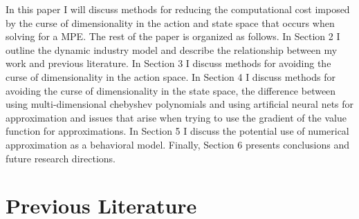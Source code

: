 \documentclass[12pt]{article}
\begin{document}


In this paper I will discuss methods for reducing the computational cost imposed by the curse of dimensionality in the action and state space that occurs when solving for a MPE. The rest of the paper is organized as follows. In Section 2 I outline the dynamic industry model and describe the relationship between my work and previous literature. In Section 3 I discuss methods for avoiding the curse of dimensionality in the action space. In Section 4 I discuss methods for avoiding the curse of dimensionality in the state space, the difference between using multi-dimensional chebyshev polynomials and using artificial neural nets for approximation and issues that arise when trying to use the gradient of the value function for approximations. In Section 5 I discuss the potential use of numerical approximation as a behavioral model. Finally, Section 6 presents conclusions and future research directions.

\section{Previous Literature}
\end{document}
